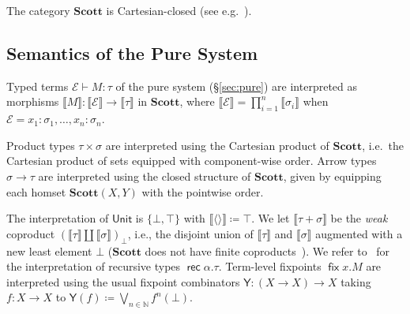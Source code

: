 \documentclass[%
  a4paper,
  UKenglish,
  cleveref,
  autoref,
  thm-restate,
  numberwithinsect,
]{lipics-v2021}
\newcommand\deq\coloneqq
\newcommand\thesis{\vdash}
\newcommand\pair[1]{{\langle #1\rangle}}
\newcommand\NN{\mathbb{N}}
\newcommand\I[1]{\llbracket #1 \rrbracket} %
\newcommand\Scott{\mathbf{Scott}}
\newcommand\Env{\mathcal{E}}    %
\newcommand\term[1]{\mathsf{#1}}
\newcommand\type[1]{\term{#1}}
\newcommand\fix{\mathop{\term{fix}}}
\newcommand\Unit{\type{Unit}}
\newcommand\rec{\mathop{\type{rec}}}	%
\newcommand\TV{\alpha}		%
\newcommand\PT{\tau}		%
\newcommand\PTbis{\sigma}	%
\begin{document}
The category $\Scott$ is Cartesian-closed
(see e.g.\ \cite[Corollary 4.1.6]{aj95chapter}).





\subsection{Semantics of the Pure System}
\label{sec:sem:pure}

Typed terms $\Env \thesis M : \PT$ of the pure system (\S\ref{sec:pure})
are interpreted as morphisms $\I M \colon \I\Env \to \I\PT$ in $\Scott$,
where $\I{\Env} = \prod_{i=1}^n\I{\PTbis_i}$ when
$\Env = x_1:\PTbis_1,\dots,x_n:\PTbis_n$.%
%
%

Product types $\PT \times \PTbis$ are interpreted using
the Cartesian product of $\Scott$, i.e.\ the Cartesian product
of sets equipped with component-wise order.
%
Arrow types $\PTbis \to \PT$ are interpreted using the
closed structure of $\Scott$,
given by equipping each homset $\Scott(X,Y)$ with the pointwise order.

The interpretation of $\Unit$ is $\{\bot, \top\}$
with $\I{\pair{}} \deq \top$.
We let $\I{\PT + \PTbis}$ be the \emph{weak} coproduct
$(\I\PT \amalg \I\PTbis)_\bot$,
i.e.,
the disjoint union of $\I\PT$ and $\I\PTbis$ augmented with a new least element $\bot$
($\Scott$ does not have finite coproducts~\cite{hp90tcs}).
%
We refer to~\cite{ac98book,aj95chapter,streicher06book}
for the interpretation of recursive types $\rec\TV.\PT$.
%
Term-level fixpoints $\fix x.M$ are interpreted
using the usual fixpoint combinators $\term Y \colon (X \to X) \to X$
taking $f \colon X \to X$ to $\term Y(f) \deq \bigvee_{n \in \NN} f^n(\bot)$.
\end{document}
